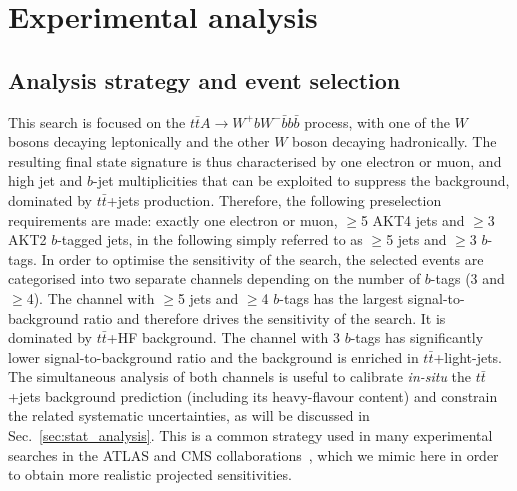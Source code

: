 \documentclass[preprintnumbers,superscriptaddress,nofootinbib,aps,prd,floatfix]{revtex4}
\newcommand{\ttbar}{\ensuremath{t\bar{t}}}
\begin{document}
\section{Experimental analysis}
\label{sec:analysis}

\subsection{Analysis strategy and event selection}
\label{subsec:analysis}
This search is focused on the $\ttbar A \to W^+b W^- \bar{b}b\bar{b}$ process, with one of the $W$ bosons
decaying leptonically and the other $W$ boson decaying hadronically. 
The resulting final state signature is thus characterised
by one electron or muon, and high jet and $b$-jet multiplicities that can be exploited to suppress the background,
dominated by $\ttbar$+jets production. Therefore, the following preselection requirements are made:
exactly one electron or muon, $\geq$5 AKT4 jets and $\geq$3 AKT2 $b$-tagged jets, in the following simply referred
to as $\geq$5 jets and $\geq$3 $b$-tags. In order to optimise the sensitivity of the search, the selected events 
are categorised into two separate channels depending on the number of $b$-tags (3 and $\geq$4).
The channel with $\geq$5 jets and $\geq$4 $b$-tags has the largest signal-to-background ratio and 
therefore drives the sensitivity of the search. It is dominated by $\ttbar$+HF background. The channel with 3 $b$-tags 
has significantly lower signal-to-background ratio and the background is enriched in $\ttbar$+light-jets.
The simultaneous analysis of both channels is useful to calibrate {\sl in-situ} the $\ttbar$+jets background prediction 
(including its heavy-flavour content) and constrain the related systematic uncertainties, as will be discussed in
Sec.~\ref{sec:stat_analysis}. This is a common strategy used in many experimental searches in the 
ATLAS and CMS collaborations~\cite{Aad:2015gra,Khachatryan:2015ila,Aad:2015kqa}, 
which we mimic here in order to obtain more realistic projected sensitivities.
\end{document}
